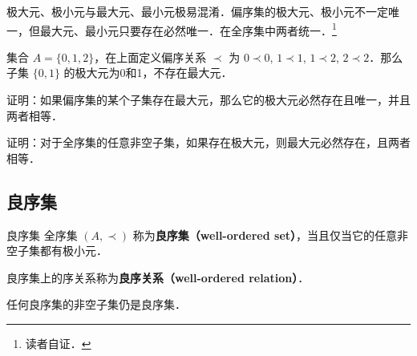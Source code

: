 极大元、极小元与最大元、最小元极易混淆．偏序集的极大元、极小元不一定唯一，但最大元、最小元只要存在必然唯一．在全序集中两者统一．\footnote{读者自证．}

\begin{example}{}
集合 $A=\{0,1,2\}$，在上面定义偏序关系 $\prec$ 为 $0\prec 0$, $1\prec 1$, $1\prec 2$, $2\prec 2$．那么子集 $\{0,1\}$ 的极大元为0和1，不存在最大元．
\end{example}

\begin{exercise}{}
证明：如果偏序集的某个子集存在最大元，那么它的极大元必然存在且唯一，并且两者相等．
\end{exercise}

\begin{exercise}{}
证明：对于全序集的任意非空子集，如果存在极大元，则最大元必然存在，且两者相等．
\end{exercise}

\subsection{良序集}

\begin{definition}{良序集}
全序集 $(A,\prec)$ 称为\textbf{良序集（well-ordered set）}，当且仅当它的任意非空子集都有极小元．
\end{definition}

良序集上的序关系称为\textbf{良序关系（well-ordered relation）}．

任何良序集的非空子集仍是良序集．